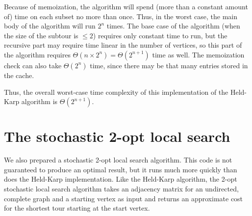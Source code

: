\documentclass[10pt]{extarticle}
\begin{document}
Because of memoization, the algorithm will spend (more than a constant amount 
of) time on each subset no more than once. Thus, in the worst case, the main
body of the algorithm will run $2^n$ times. The base case of the algorithm
(when the size of the subtour is $\leq 2$) requires only constant time to run,
but the recursive part may require time linear in the number of vertices,
so this part of the algorithm requires $\Theta(n \times 2^n) = \Theta(2^{n+1})$
time as well. The memoization check can also take $\Theta(2^n)$ time, since
there may be that many entries stored in the cache. 

Thus, the overall worst-case time complexity of this implementation of the
Held-Karp algorithm is $\Theta(2^{n+1})$. \medskip



\section{The stochastic 2-opt local search}
We also prepared a stochastic 2-opt local search algorithm. This code is not
guaranteed to produce an optimal result, but it runs much more quickly than
does the Held-Karp implementation. Like the Held-Karp algorithm, the 2-opt
stochastic local search algorithm takes an adjacency matrix for an undirected,
complete graph and a starting vertex as input and returns an approximate cost
for the shortest tour starting at the start vertex.
\end{document}
